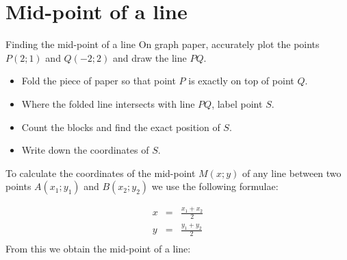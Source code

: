 \section{Mid-point of a line}
\begin{activity}{Finding the mid-point of a line}
On graph paper, accurately plot the points $P(2;1)$ and $Q(-2;2)$ and draw the line $PQ$.
\begin{itemize}
 \item Fold the piece of paper so that point $P$ is exactly on top of point $Q$.
\item Where the folded line intersects with line $PQ$, label point $S$.
\item Count the blocks and find the exact position of $S$.
\item Write down the coordinates of $S$.
\end{itemize}

\end{activity}
To calculate the coordinates of the mid-point  $M(x;y)$ of any line between two points $A(x_1;y_1)$ and $B(x_2;y_2)$ we use the following formulae:

\setcounter{subfigure}{0}
\begin{figure}[H] %
\begin{center}
\end{center}
\end{figure}      

\begin{eqnarray*}
x & = & \frac{{x}_{1} + {x}_{2}}{2} \\ 
y & = & \frac{{y}_{1} + {y}_{2}}{2} \\  
\end{eqnarray*}
From this we obtain the mid-point of a line:


